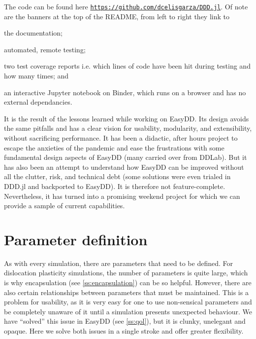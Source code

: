 The code can be found here \href{https://github.com/dcelisgarza/DDD.jl}{\texttt{https://github.com/dcelisgarza/DDD.jl}}. Of note are the banners at the top of the README, from left to right they link to
\begin{inparaenum}
    \item the documentation;
    \item automated, remote testing;
    \item two test coverage reports i.e. which lines of code have been hit during testing and how many times; and
    \item an interactive Jupyter notebook on Binder, which runs on a browser and has no external dependancies.
\end{inparaenum}

It is the result of the lessons learned while working on EasyDD. Its design avoids the same pitfalls and has a clear vision for usability, modularity, and extensibility, without sacrificing performance. It has been a didactic, after hours project to escape the anxieties of the pandemic and ease the frustrations with some fundamental design aspects of EasyDD (many carried over from DDLab). But it has also been an attempt to understand how EasyDD can be improved without all the clutter, risk, and technical debt (some solutions were even trialed in DDD.jl and backported to EasyDD). It is therefore not feature-complete. Nevertheless, it has turned into a promising weekend project for which we can provide a sample of current capabilities.

\section{Parameter definition}

As with every simulation, there are parameters that need to be defined. For dislocation plasticity simulations, the number of parameters is quite large, which is why encapsulation (see \cref{ss:encapsulation}) can be so helpful. However, there are also certain relationships between parameters that must be maintained. This is a problem for usability, as it is very easy for one to use non-sensical parameters and be completely unaware of it until a simulation presents unexpected behaviour. We have ``solved'' this issue in EasyDD (see \cref{ss:qol}), but it is clunky, unelegant and opaque. Here we solve both issues in a single stroke and offer greater flexibility.

